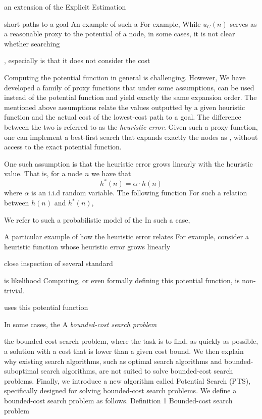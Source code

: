 
an extension of the Explicit Estimation 



short paths to a goal 
An example of such a 
For example, While $u_C(n)$ serves as a reasonable proxy to the potential of a node, in some cases, 
it is not clear whether searching 

, especially  is that it does not consider the cost 

Computing the potential function in general is challenging. However, 
We have developed a family of proxy functions that under some assumptions, can be used instead of the potential function and yield exactly the same expansion order. 
The mentioned above assumptions relate the values outputted by a given heuristic function and the actual cost of the lowest-cost path to a goal. The difference between the two is referred to as the \emph{heuristic error}. 
Given such a proxy function, one can implement a best-first search that expands exactly the nodes as \PTS, without access to the exact potential function. %


One such assumption is that the heuristic error grows linearly with the heuristic value. That is, for a node $n$
we have that 
\begin{equation}
 h^*(n)=\alpha\cdot h(n)   
\end{equation}
where $\alpha$ is an i.i.d random variable. 
The following function
For such a relation between $h(n)$ and $h^*(n)$, 



We refer to such a probabilistic model of the In such a case, 


A particular example of how the heuristic error relates For example, consider a heuristic function whose heuristic error grows linearly 


close inspection of several standard 


is likelihood 
Computing, or even formally defining this potential function, is non-trivial.  








\PTS uses this potential function 



In some cases, the 
A \emph{bounded-cost search problem}

the bounded-cost search problem, where the task is to find, as quickly as possible, a solution with a cost that is lower than a given cost bound. We then explain why existing search algorithms, such as optimal search algorithms and bounded-suboptimal search algorithms, are not suited to solve bounded-cost search problems. Finally, we introduce a new algorithm called Potential Search (PTS), specifically designed for solving bounded-cost search problems. We define a bounded-cost search problem as follows.
Definition 1 Bounded-cost search problem

